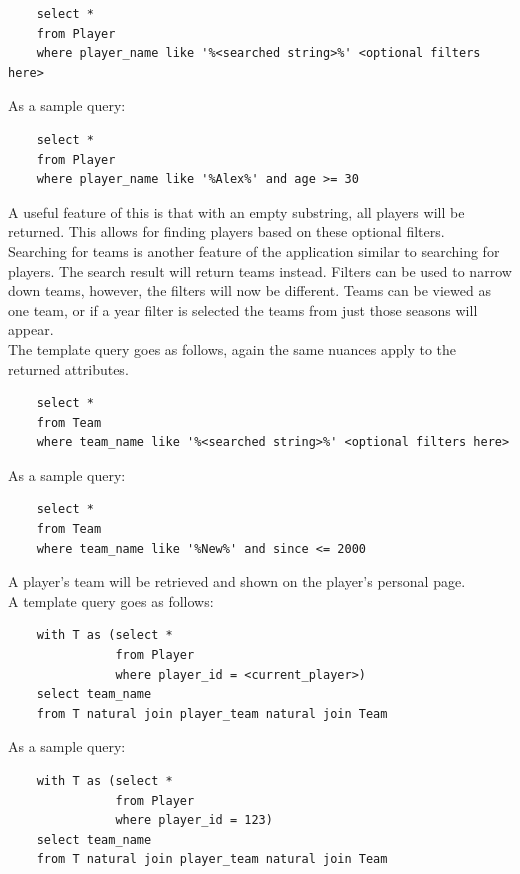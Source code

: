 \documentclass[11pt]{article}
\begin{document}
\begin{verbatim}
    select *
    from Player
    where player_name like '%<searched string>%' <optional filters here>
\end{verbatim}

As a sample query:
\begin{verbatim}
    select *
    from Player
    where player_name like '%Alex%' and age >= 30
\end{verbatim}

A useful feature of this is that with an empty substring, all players will be returned. This allows for finding players based on these optional filters. \\


Searching for teams is another feature of the application similar to searching for players. The search result will return teams instead. Filters can be used to narrow down teams, however, the filters will now be different. Teams can be viewed as one team, or if a year filter is selected the teams from just those seasons will appear. \\

The template query goes as follows, again the same nuances apply to the returned attributes.
\begin{verbatim}
    select *
    from Team
    where team_name like '%<searched string>%' <optional filters here>
\end{verbatim}

As a sample query:
\begin{verbatim}
    select *
    from Team
    where team_name like '%New%' and since <= 2000
\end{verbatim}

A player's team will be retrieved and shown on the player's personal page.\\ 

A template query goes as follows:
\begin{verbatim}
    with T as (select *
               from Player
               where player_id = <current_player>)
    select team_name
    from T natural join player_team natural join Team
\end{verbatim}

As a sample query:
\begin{verbatim}
    with T as (select *
               from Player
               where player_id = 123)
    select team_name
    from T natural join player_team natural join Team
\end{verbatim}
\end{document}

